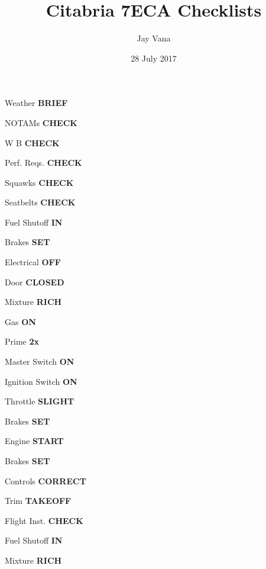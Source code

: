 \documentclass[8pt]{article}
\title{Citabria 7ECA Checklists}
\author{Jay Vana}
\date{28 July 2017}
\begin{document}

\def\arraystretch{1.3}
\begin{multicols*}{3}


\colorbox{green!80!red}{}

Weather \dotfill \textbf{BRIEF}

NOTAMs \dotfill \textbf{CHECK}

W B \dotfill \textbf{CHECK}

Perf. Reqs. \dotfill \textbf{CHECK}

Squawks \dotfill \textbf{CHECK}

\colorbox{green!80!red}{}

\colorbox{green!80!red}{}

Seatbelts \dotfill \textbf{CHECK}

Fuel Shutoff \dotfill \textbf{IN}

Brakes \dotfill \textbf{SET}

Electrical \dotfill \textbf{OFF}

Door \dotfill \textbf{CLOSED}

Mixture \dotfill \textbf{RICH}

Gas \dotfill \textbf{ON}

\colorbox{orange!80}{}

Prime \dotfill \textbf{2x}

Master Switch \dotfill \textbf{ON}

Ignition Switch \dotfill \textbf{ON}

Throttle \dotfill \textbf{SLIGHT}

Brakes \dotfill \textbf{SET}

Engine \dotfill \textbf{START} \\

\colorbox{green!80!red}{}

Brakes \dotfill \textbf{SET}

Controls \dotfill \textbf{CORRECT}

Trim \dotfill \textbf{TAKEOFF}

Flight Inst. \dotfill \textbf{CHECK}

Fuel Shutoff \dotfill \textbf{IN}

Mixture \dotfill \textbf{RICH}


\end{multicols*}
\end{document}

